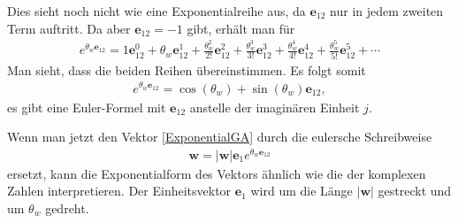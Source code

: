 Dies sieht noch nicht wie eine Exponentialreihe aus, da $\mathbf{e}_{12}$ nur in jedem zweiten Term auftritt. Da aber $\mathbf{e}_{12}=-1$ gibt, erhält man für
\begin{align}
	e^{\theta_w\mathbf{e}_{12}} = 1 \mathbf{e}_{12}^0+\theta_w\mathbf{e}_{12}^1+{\frac {\theta_w^{2}}{2!}}\mathbf{e}_{12}^2+{\frac {\theta_w^{3}}{3!}}\mathbf{e}_{12}^3+{\frac {\theta_w^{4}}{4!}}\mathbf{e}_{12}^4+{\frac {\theta_w^{5}}{5!}}\mathbf{e}_{12}^5+\cdots
	\label{ExponentialGA2}
\end{align}
Man sieht, dass die beiden Reihen übereinstimmen. Es folgt somit
\begin{align}\label{EulerGA}
	e^{\theta_w \mathbf{e}_{12}} = \cos(\theta_w)+ \sin(\theta_w) \mathbf{e}_{12},
\end{align} 
es gibt eine Euler-Formel mit $\mathbf{e}_{12}$ anstelle der imaginären Einheit $j$.

Wenn man jetzt den Vektor \eqref{ExponentialGA} durch die eulersche Schreibweise
\begin{align}
	\mathbf{w} = |\mathbf{w}|\mathbf{e}_1e^{\theta_w\mathbf{e}_{12}}
\end{align}
ersetzt, kann die Exponentialform des Vektors ähnlich wie die der komplexen Zahlen interpretieren. Der Einheitsvektor $\mathbf{e}_1$ wird um die Länge $|\mathbf{w}|$ gestreckt und um $\theta_w$ gedreht.
